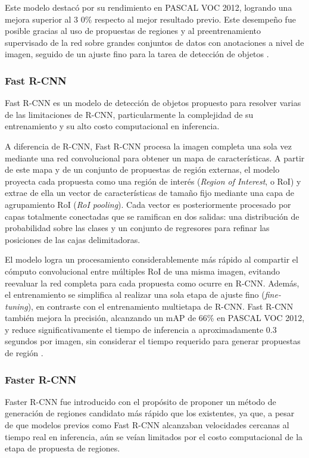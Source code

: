 Este modelo destacó por su rendimiento en PASCAL VOC 2012, logrando una mejora superior al 3
0\% respecto al mejor resultado previo. Este desempeño fue posible gracias al uso 
de propuestas de regiones y al preentrenamiento supervisado de la red sobre grandes conjuntos 
de datos con anotaciones a nivel de imagen, seguido de un ajuste fino para la tarea 
de detección de objetos \parencite{girshick2014rich}.

\subsubsection{Fast R-CNN}
Fast R-CNN es un modelo de detección de objetos propuesto para resolver varias de las limitaciones de 
R-CNN, particularmente la complejidad de su entrenamiento y su alto costo computacional en inferencia.
\medskip

A diferencia de R-CNN, Fast R-CNN procesa la imagen completa una sola vez mediante una red convolucional 
para obtener un mapa de características. A partir de este mapa y de un conjunto de propuestas de región 
externas, el modelo proyecta cada propuesta como una región de interés (\textit{Region of Interest}, o RoI) 
y extrae de ella un vector de características de tamaño fijo mediante una capa de agrupamiento RoI 
(\textit{RoI pooling}). Cada vector es posteriormente procesado por capas totalmente conectadas que se 
ramifican en dos salidas: una distribución de probabilidad sobre las clases y un conjunto de regresores 
para refinar las posiciones de las cajas delimitadoras.
\medskip

El modelo logra un procesamiento considerablemente más rápido al compartir el cómputo convolucional 
entre múltiples RoI de una misma imagen, evitando reevaluar la red completa para cada propuesta como 
ocurre en R-CNN. Además, el entrenamiento se simplifica al realizar una sola etapa de ajuste fino 
(\textit{fine-tuning}), en contraste con el entrenamiento multietapa de R-CNN. Fast R-CNN también 
mejora la precisión, alcanzando un mAP de 66\% en PASCAL VOC 2012, y reduce significativamente el 
tiempo de inferencia a aproximadamente 0.3 segundos por imagen, sin considerar el tiempo requerido 
para generar propuestas de región \parencite{girshick2015fast}.

\subsubsection{Faster R-CNN}
Faster R-CNN fue introducido con el propósito de proponer un método de generación de regiones candidato 
más rápido que los existentes, ya que, a pesar de que modelos previos como Fast R-CNN alcanzaban velocidades 
cercanas al tiempo real en inferencia, aún se veían limitados por el costo computacional de la etapa 
de propuesta de regiones.
\medskip

